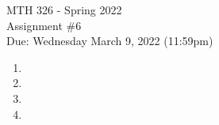 \documentclass[12pt]{article}
\begin{document}
\pagestyle{fancy}
\fancyhf{}

\noindent MTH 326 - Spring 2022
\\Assignment \#6
\\Due: Wednesday March 9, 2022 (11:59pm)

\begin{enumerate}
    \item 
    \newpage
    \item 
    \newpage
    \item 
    \vspace{.35in}
    \item 
    \end{enumerate}
\end{document}
